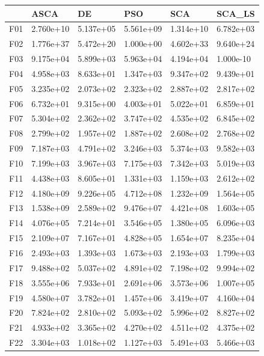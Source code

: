 \begin{tabular}{llllll}
\toprule
{} &       ASCA &         DE &        PSO &        SCA &     SCA\_LS \\
\midrule
F01  &  2.760e+10 &  5.137e+05 &  5.561e+09 &  1.314e+10 &  6.782e+03 \\
F02  &  1.776e+37 &  5.472e+20 &  1.000e+00 &  4.602e+33 &  9.640e+24 \\
F03  &  9.175e+04 &  5.899e+03 &  5.963e+04 &  4.194e+04 &  1.000e-10 \\
F04  &  4.958e+03 &  8.633e+01 &  1.347e+03 &  9.347e+02 &  9.439e+01 \\
F05  &  3.235e+02 &  2.073e+02 &  2.323e+02 &  2.887e+02 &  2.817e+02 \\
F06  &  6.732e+01 &  9.315e+00 &  4.003e+01 &  5.022e+01 &  6.859e+01 \\
F07  &  5.304e+02 &  2.362e+02 &  3.747e+02 &  4.535e+02 &  6.845e+02 \\
F08  &  2.799e+02 &  1.957e+02 &  1.887e+02 &  2.608e+02 &  2.768e+02 \\
F09  &  7.187e+03 &  4.791e+02 &  3.246e+03 &  5.374e+03 &  9.582e+03 \\
F10  &  7.199e+03 &  3.967e+03 &  7.175e+03 &  7.342e+03 &  5.019e+03 \\
F11  &  4.438e+03 &  8.605e+01 &  1.331e+03 &  1.159e+03 &  2.612e+02 \\
F12  &  4.180e+09 &  9.226e+05 &  4.712e+08 &  1.232e+09 &  1.564e+05 \\
F13  &  1.538e+09 &  2.589e+02 &  9.476e+07 &  4.421e+08 &  1.603e+05 \\
F14  &  4.076e+05 &  7.214e+01 &  3.546e+05 &  1.380e+05 &  6.096e+03 \\
F15  &  2.109e+07 &  7.167e+01 &  4.828e+05 &  1.654e+07 &  8.235e+04 \\
F16  &  2.493e+03 &  1.393e+03 &  1.673e+03 &  2.193e+03 &  1.799e+03 \\
F17  &  9.488e+02 &  5.037e+02 &  4.891e+02 &  7.198e+02 &  9.994e+02 \\
F18  &  3.555e+06 &  7.933e+01 &  2.691e+06 &  3.573e+06 &  1.007e+05 \\
F19  &  4.580e+07 &  3.782e+01 &  1.457e+06 &  3.419e+07 &  4.160e+04 \\
F20  &  7.824e+02 &  2.810e+02 &  5.093e+02 &  5.996e+02 &  8.827e+02 \\
F21  &  4.933e+02 &  3.365e+02 &  4.270e+02 &  4.511e+02 &  4.375e+02 \\
F22  &  3.304e+03 &  1.018e+02 &  1.127e+03 &  5.491e+03 &  5.466e+03 \\

\end{tabular}
